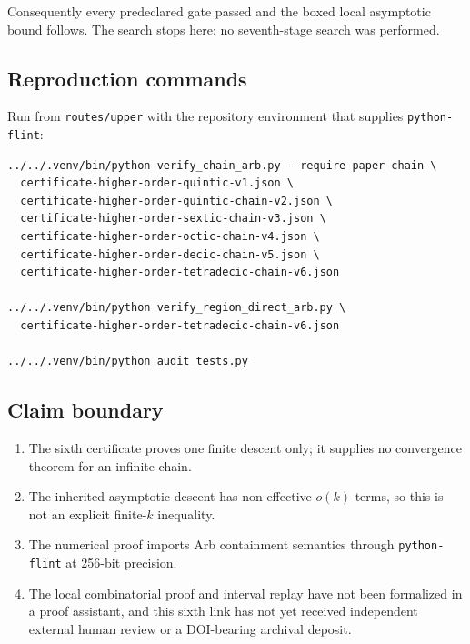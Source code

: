 Consequently every predeclared gate passed and the boxed local
asymptotic bound follows. The search stops here: no seventh-stage search
was performed.

\subsection{Reproduction commands}

Run from \texttt{routes/upper} with the repository environment that
supplies \texttt{python-flint}:

\begin{verbatim}
../../.venv/bin/python verify_chain_arb.py --require-paper-chain \
  certificate-higher-order-quintic-v1.json \
  certificate-higher-order-quintic-chain-v2.json \
  certificate-higher-order-sextic-chain-v3.json \
  certificate-higher-order-octic-chain-v4.json \
  certificate-higher-order-decic-chain-v5.json \
  certificate-higher-order-tetradecic-chain-v6.json

../../.venv/bin/python verify_region_direct_arb.py \
  certificate-higher-order-tetradecic-chain-v6.json

../../.venv/bin/python audit_tests.py
\end{verbatim}

\subsection{Claim boundary}

\begin{enumerate}
\def\labelenumi{\arabic{enumi}.}
\tightlist
\item
  The sixth certificate proves one finite descent only; it supplies no
  convergence theorem for an infinite chain.
\item
  The inherited asymptotic descent has non-effective \(o(k)\) terms, so
  this is not an explicit finite-\(k\) inequality.
\item
  The numerical proof imports Arb containment semantics through
  \texttt{python-flint} at 256-bit precision.
\item
  The local combinatorial proof and interval replay have not been
  formalized in a proof assistant, and this sixth link has not yet
  received independent external human review or a DOI-bearing archival
  deposit.
\end{enumerate}
